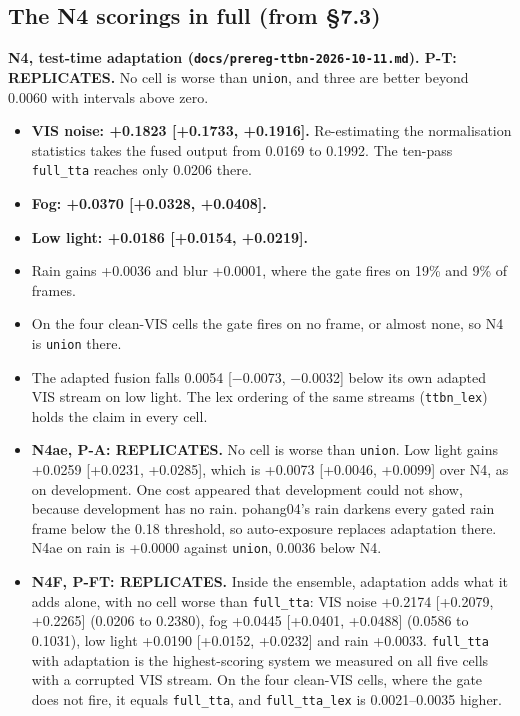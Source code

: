 \documentclass[10pt]{article}
\begin{document}
\subsection{The N4 scorings in full (from \S7.3)}\label{app:K.3}
\textbf{N4, test-time adaptation (\texttt{docs/\allowbreak{}prereg-ttbn-2026-10-11.md}). P-T: REPLICATES.} No cell is worse than \texttt{union}, and three are better beyond 0.0060 with intervals above zero.
\begin{itemize}
\item \textbf{VIS noise: +0.1823 [+0.1733, +0.1916].} Re-estimating the normalisation statistics takes the fused output from 0.0169 to 0.1992. The ten-pass \texttt{full\_\allowbreak{}tta} reaches only 0.0206 there.
\item \textbf{Fog: +0.0370 [+0.0328, +0.0408].}
\item \textbf{Low light: +0.0186 [+0.0154, +0.0219].}
\item Rain gains +0.0036 and blur +0.0001, where the gate fires on 19\% and 9\% of frames.
\item On the four clean-VIS cells the gate fires on no frame, or almost none, so N4 is \texttt{union} there.
\item The adapted fusion falls 0.0054 [$-$0.0073, $-$0.0032] below its own adapted VIS stream on low light. The lex ordering of the same streams (\texttt{ttbn\_\allowbreak{}lex}) holds the claim in every cell.
\item \textbf{N4ae, P-A: REPLICATES.} No cell is worse than \texttt{union}. Low light gains +0.0259 [+0.0231, +0.0285], which is +0.0073 [+0.0046, +0.0099] over N4, as on development. One cost appeared that development could not show, because development has no rain. pohang04's rain darkens every gated rain frame below the 0.18 threshold, so auto-exposure replaces adaptation there. N4ae on rain is +0.0000 against \texttt{union}, 0.0036 below N4.
\item \textbf{N4F, P-FT: REPLICATES.} Inside the ensemble, adaptation adds what it adds alone, with no cell worse than \texttt{full\_\allowbreak{}tta}: VIS noise +0.2174 [+0.2079, +0.2265] (0.0206 to 0.2380), fog +0.0445 [+0.0401, +0.0488] (0.0586 to 0.1031), low light +0.0190 [+0.0152, +0.0232] and rain +0.0033. \texttt{full\_\allowbreak{}tta} with adaptation is the highest-scoring system we measured on all five cells with a corrupted VIS stream. On the four clean-VIS cells, where the gate does not fire, it equals \texttt{full\_\allowbreak{}tta}, and \texttt{full\_\allowbreak{}tta\_\allowbreak{}lex} is 0.0021--0.0035 higher.

\end{itemize}
\end{document}
